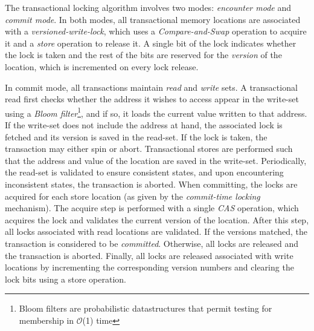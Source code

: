 The transactional locking algorithm involves two modes: \textit{encounter mode} and \textit{commit mode}. In both modes, all transactional memory locations are associated with a \textit{versioned-write-lock}, which uses a \textit{Compare-and-Swap} operation to acquire it and a \textit{store} operation to release it. A single bit of the lock indicates whether the lock is taken and the rest of the bits are reserved for the \textit{version} of the location, which is incremented on every lock release.\par 

In commit mode, all transactions maintain \textit{read} and \textit{write} sets. A transactional read first checks whether the address it wishes to access appear in the write-set using a \textit{Bloom filter}\footnote{Bloom filters are probabilistic datastructures that permit testing for membership in $\mathcal{O}$(1) time}, and if so, it loads the current value written to that address. If the write-set does not include the address at hand, the associated lock is fetched and its version is saved in the read-set. If the lock is taken, the transaction may either spin or abort\cite{tl}. Transactional stores are performed such that the address and value of the location are saved in the write-set. Periodically, the read-set is validated to ensure consistent states, and upon encountering inconsistent states, the transaction is aborted\cite{tl}. When committing, the locks are acquired for each store location (as given by the \textit{commit-time locking} mechanism). The acquire step is performed with a single \textit{CAS} operation, which acquires the lock and validates the current version of the location\cite{tl}. After this step, all locks associated with read locations are validated. If the versions matched, the transaction is considered to be \textit{committed}. Otherwise, all locks are released and the transaction is aborted\cite{tl}. Finally, all locks are released associated with write locations by incrementing the corresponding version numbers and clearing the lock bits using a store operation\cite{tl}.\par


